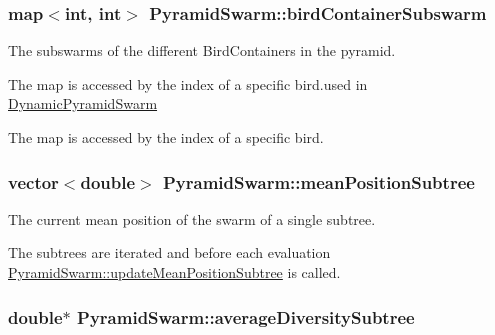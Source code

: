\hypertarget{classPyramidSwarm_5e30f75b1ffdf42ce0d17b6473df1e16}{
\subsubsection{\setlength{\rightskip}{0pt plus 5cm}map$<$int, int$>$ {\bf PyramidSwarm::birdContainerSubswarm}}}
\label{classPyramidSwarm_5e30f75b1ffdf42ce0d17b6473df1e16}


The subswarms of the different BirdContainers in the pyramid. 

The map is accessed by the index of a specific bird.used in \hyperlink{classDynamicPyramidSwarm}{DynamicPyramidSwarm}\par
 The map is accessed by the index of a specific bird. \hypertarget{classPyramidSwarm_a9e6c7b093b4043e6f918e137c77e6de}{
\subsubsection{\setlength{\rightskip}{0pt plus 5cm}vector$<$double$>$ {\bf PyramidSwarm::meanPositionSubtree}}}
\label{classPyramidSwarm_a9e6c7b093b4043e6f918e137c77e6de}


The current mean position of the swarm of a single subtree. 

The subtrees are iterated and before each evaluation \hyperlink{classPyramidSwarm_113cc1a3ee99a45c346fd3018a20ea7b}{PyramidSwarm::updateMeanPositionSubtree} is called. \hypertarget{classPyramidSwarm_09297866e64a19ada0b4898c69bbbd3a}{
\subsubsection{\setlength{\rightskip}{0pt plus 5cm}double$\ast$ {\bf PyramidSwarm::averageDiversitySubtree}}}
\label{classPyramidSwarm_09297866e64a19ada0b4898c69bbbd3a}


